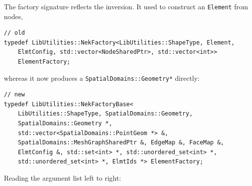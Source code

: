 The factory signature reflects the inversion. It used to construct an
\texttt{Element} from nodes,

\begin{lstlisting}[style=BashInputStyle]
// old
typedef LibUtilities::NekFactory<LibUtilities::ShapeType, Element,
    ElmtConfig, std::vector<NodeSharedPtr>, std::vector<int>>
    ElementFactory;
\end{lstlisting}

\noindent whereas it now produces a
\texttt{SpatialDomains::Geometry*} directly:

\begin{lstlisting}[style=BashInputStyle]
// new
typedef LibUtilities::NekFactoryBase<
    LibUtilities::ShapeType, SpatialDomains::Geometry,
    SpatialDomains::Geometry *,
    std::vector<SpatialDomains::PointGeom *> &,
    SpatialDomains::MeshGraphSharedPtr &, EdgeMap &, FaceMap &,
    ElmtConfig &, std::set<int> *, std::unordered_set<int> *,
    std::unordered_set<int> *, ElmtIds *> ElementFactory;
\end{lstlisting}

Reading the argument list left to right:

